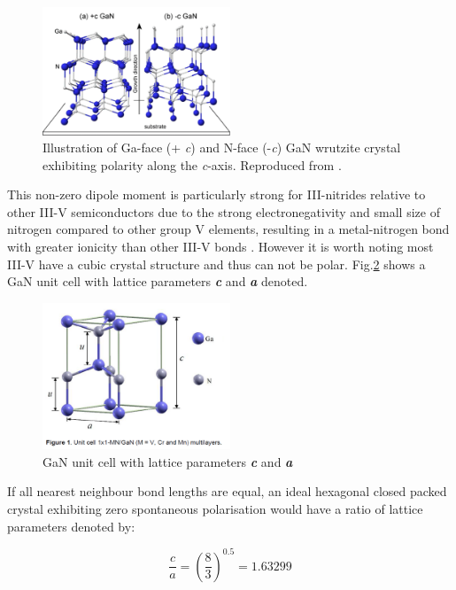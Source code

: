 \begin{figure}[h]
	\centering
	\includegraphics[width=0.5\textwidth]{Figs/Ch1/p2.png}
	\caption {Illustration of Ga-face (+ {\it c}) and N-face (-{\it c}) GaN wrutzite crystal exhibiting polarity along the {\it c}-axis. Reproduced from \cite{Sumiya2004}.}
	\label{1.3}
\end{figure}
\FloatBarrier

This non-zero dipole moment is particularly strong for III-nitrides relative to other III-V semiconductors due to the strong electronegativity and small size of nitrogen compared to other group V elements, resulting in a metal-nitrogen bond with greater ionicity than other III-V bonds \cite{wood2007polarization}. However it is worth noting most III-V have a cubic crystal structure and thus can not be polar. Fig.\ref{1.4} shows a GaN unit cell with lattice parameters {\textbf {\it c}} and \textbf{\it a} denoted.

\begin{figure}[h]
	\centering
	\includegraphics[width=0.5\textwidth]{Figs/Ch1/2unit.png}
	\caption {GaN unit cell with lattice parameters \textbf{\it c} and \textbf{\it a} \cite{Miguel2014}}
	\label{1.4}
\end{figure}
\FloatBarrier 

If all nearest neighbour bond lengths are equal, an ideal hexagonal closed packed crystal exhibiting zero spontaneous polarisation would have a ratio of lattice parameters denoted by:

\begin{equation}
\frac{c}{a}= (\frac{8}{3})^{0.5} = 1.63299
\end{equation} 

